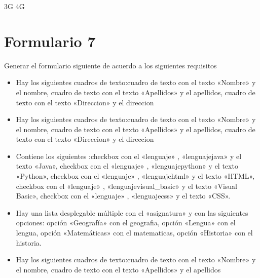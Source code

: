 \documentclass[letterpaper,10pt,spanish]{sphinxmanual}
\begin{document}
\begin{sphinxVerbatim}[commandchars=\\\{\}]
     3G
     4G
\end{sphinxVerbatim}


\section{Formulario 7}
\label{\detokenize{ejercicios/formularios/anexo_formularios:formulario-7}}
Generar el formulario siguiente de acuerdo a los siguientes requisitos
\begin{itemize}
\item {} 
Hay los siguientes cuadros de texto:cuadro de texto con el texto «Nombre» y el  nombre, cuadro de texto con el texto «Apellidos» y el  apellidos, cuadro de texto con el texto «Direccion» y el  direccion

\item {} 
Hay los siguientes cuadros de texto:cuadro de texto con el texto «Nombre» y el  nombre, cuadro de texto con el texto «Apellidos» y el  apellidos, cuadro de texto con el texto «Direccion» y el  direccion

\item {} 
Contiene los siguientes :checkbox con el   «lenguaje» ,   «lenguajejava»  y el texto «Java», checkbox con el   «lenguaje» ,   «lenguajepython»  y el texto «Python», checkbox con el   «lenguaje» ,   «lenguajehtml»  y el texto «HTML», checkbox con el   «lenguaje» ,   «lenguajevisual\_basic»  y el texto «Visual Basic», checkbox con el   «lenguaje» ,   «lenguajecss»  y el texto «CSS».

\item {} 
Hay una lista desplegable múltiple con el  «asignatura» y con las siguientes opciones: opción «Geografía» con el  geografia, opción «Lengua» con el  lengua, opción «Matemáticas» con el  matematicas, opción «Historia» con el  historia.

\item {} 
Hay los siguientes cuadros de texto:cuadro de texto con el texto «Nombre» y el  nombre, cuadro de texto con el texto «Apellidos» y el  apellidos

\end{itemize}
\end{document}
